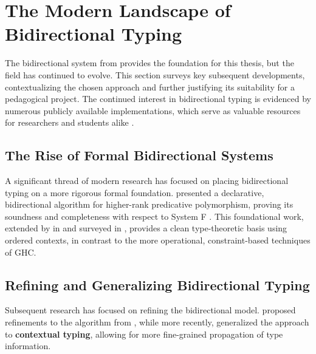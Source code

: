 \section{The Modern Landscape of Bidirectional Typing}
\label{chap:LiteratureReview:sec:TypeInferenceAlgorithm}

The bidirectional system from \cite{jones-practical-2007} provides the foundation for this thesis, but the field has continued to evolve. This section surveys key subsequent developments, contextualizing the chosen approach and further justifying its suitability for a pedagogical project. The continued interest in bidirectional typing is evidenced by numerous publicly available implementations, which serve as valuable resources for researchers and students alike \cite{github-goldenberg-artem-goldenbergbidirectionalsystem-2025, github-choi-kwanghoonbidi-2025, github-chen-cu1ch3ntype-inference-zoo-2025}.

\subsection{The Rise of Formal Bidirectional Systems}

A significant thread of modern research has focused on placing bidirectional typing on a more rigorous formal foundation. \citeauthor{dunfield-complete-2013} \cite{dunfield-complete-2013} presented a declarative, bidirectional algorithm for higher-rank predicative polymorphism, proving its soundness and completeness with respect to System F \cite{selinger-lecture-2013}. This foundational work, extended by \citeauthor{dunfield-sound-2019} in \cite{dunfield-sound-2019} and surveyed in \cite{dunfield-bidirectional-2020}, provides a clean type-theoretic basis using ordered contexts, in contrast to the more operational, constraint-based techniques of GHC.

\subsection{Refining and Generalizing Bidirectional Typing}

Subsequent research has focused on refining the bidirectional model. \citeauthor{xie-higher-rank} \cite{xie-higher-rank} proposed refinements to the algorithm from \cite{dunfield-complete-2013}, while more recently, \citeauthor{xue-contextual-2024} \cite{xue-contextual-2024} generalized the approach to \textbf{contextual typing}, allowing for more fine-grained propagation of type information.

